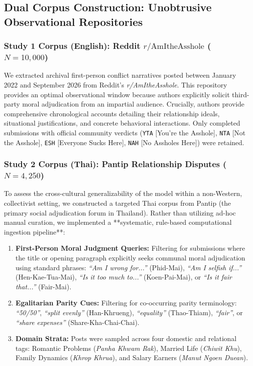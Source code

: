 \subsection{Dual Corpus Construction: Unobtrusive Observational Repositories}

\subsubsection{Study 1 Corpus (English): Reddit $r/\text{AmItheAsshole}$ ($N = 10,000$)}
We extracted archival first-person conflict narratives posted between January 2022 and September 2026 from Reddit's \textit{r/AmItheAsshole}. This repository provides an optimal observational window because authors explicitly solicit third-party moral adjudication from an impartial audience. Crucially, authors provide comprehensive chronological accounts detailing their relationship ideals, situational justifications, and concrete behavioral interactions. Only completed submissions with official community verdicts (\texttt{YTA} [You're the Asshole], \texttt{NTA} [Not the Asshole], \texttt{ESH} [Everyone Sucks Here], \texttt{NAH} [No Assholes Here]) were retained.

\subsubsection{Study 2 Corpus (Thai): Pantip Relationship Disputes ($N = 4,250$)}
To assess the cross-cultural generalizability of the model within a non-Western, collectivist setting, we constructed a targeted Thai corpus from Pantip (the primary social adjudication forum in Thailand). Rather than utilizing ad-hoc manual curation, we implemented a **systematic, rule-based computational ingestion pipeline**:
\begin{enumerate}[leftmargin=*]
    \item \textbf{First-Person Moral Judgment Queries:} Filtering for submissions where the title or opening paragraph explicitly seeks communal moral adjudication using standard phrases: \textit{``Am I wrong for...''} (Phid-Mai), \textit{``Am I selfish if...''} (Hen-Kae-Tua-Mai), \textit{``Is it too much to...''} (Koen-Pai-Mai), or \textit{``Is it fair that...''} (Fair-Mai).
    \item \textbf{Egalitarian Parity Cues:} Filtering for co-occurring parity terminology: \textit{``50/50''}, \textit{``split evenly''} (Han-Khrueng), \textit{``equality''} (Thao-Thiam), \textit{``fair''}, or \textit{``share expenses''} (Share-Kha-Chai-Chai).
    \item \textbf{Domain Strata:} Posts were sampled across four domestic and relational tags: Romantic Problems (\textit{Panha Khwam Rak}), Married Life (\textit{Chiwit Khu}), Family Dynamics (\textit{Khrop Khrua}), and Salary Earners (\textit{Manut Ngoen Duean}).
\end{enumerate}

